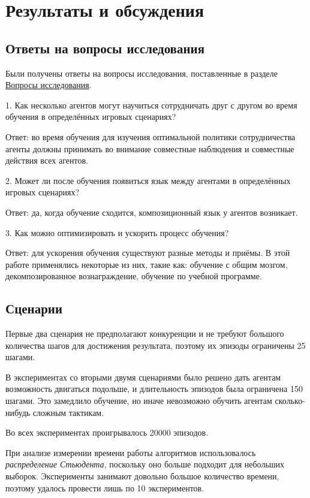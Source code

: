 \chapter{Результаты и обсуждения}


\section{Ответы на вопросы исследования}

Были получены ответы на вопросы исследования, поставленные в разделе \hyperref[intro-questions]{Вопросы исследования}.

1. Как несколько агентов могут научиться сотрудничать друг с другом во время обучения в определённых игровых сценариях?

Ответ: во время обучения для изучения оптимальной политики сотрудничества агенты должны принимать во внимание совместные наблюдения и совместные действия всех агентов.

2. Может ли после обучения появиться язык между агентами в определённых игровых сценариях?

Ответ: да, когда обучение сходится, композиционный язык у агентов возникает.

3. Как можно оптимизировать и ускорить процесс обучения?

Ответ: для ускорения обучения существуют разные методы и приёмы. В этой работе применялись некоторые из них, такие как: обучение с общим мозгом, декомпозированное вознаграждение, обучение по учебной программе.

\section{Сценарии}

Первые два сценария не предполагают конкуренции и не требуют большого количества шагов для достижения результата, поэтому их эпизоды ограничены 25 шагами.

В экспериментах со вторыми двумя сценариями было решено дать агентам возможность двигаться подольше, и длительность эпизодов была ограничена 150 шагами. Это замедлило обучение, но иначе невозможно обучить агентам сколько-нибудь сложным тактикам.

Во всех экспериментах проигрывалось 20000 эпизодов.

При анализе измерении времени работы алгоритмов использовалось \textit{распределение Стьюдента}, поскольку оно больше подходит для небольших выборок. Эксперименты занимают довольно большое количество времени, поэтому удалось провести лишь по 10 экспериментов.

